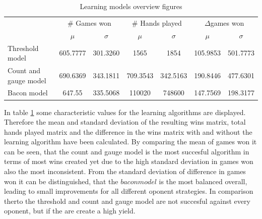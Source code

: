 \documentclass[11pt]{article}
\begin{document}
\begin{table}[]
\centering
\caption{Learning models overview figures}
\label{Learning models overview}
\begin{tabular}{lcccccc}
\cline{2-7}
                                           & \multicolumn{2}{c}{\# Games won}                      & \multicolumn{2}{c}{\# Hands played}                   & \multicolumn{2}{c}{$\Delta$games won} \\ \cline{2-7} 
\multicolumn{1}{c|}{}                       & \multicolumn{1}{c|}{$\mu$} & \multicolumn{1}{c|}{$\sigma$} & \multicolumn{1}{c|}{$\mu$} & \multicolumn{1}{c|}{$\sigma$} & \multicolumn{1}{c|}{$\mu$} & $\sigma$ \\ \hline
\multicolumn{1}{l|}{Threshold model}       & 605.7777                   & \multicolumn{1}{c|}{301.3260} & 1565                       & \multicolumn{1}{c|}{1854}     & 105.9853                   & 501.7773 \\ \hline
\multicolumn{1}{l|}{Count and gauge model} & 690.6369                   & \multicolumn{1}{c|}{343.1811} & 709.3543                   & \multicolumn{1}{c|}{342.5163} & 190.8446                   & 477.6301 \\ \hline
\multicolumn{1}{l|}{Bacon model}           & 647.55                     & \multicolumn{1}{c|}{335.5068}         & 110020                     & \multicolumn{1}{c|}{748600}   & 147.7569                            & 198.3177        \\ \hline

\end{tabular}
\end{table}


In table \ref{Learning models overview} some characteristic values for the learning algorithms are displayed. Therefore the mean and standard deviation of the resulting wins matrix, total hands played matrix and the difference in the wins matrix with and without the learning algorithm have been calculated. By comparing the mean of games won it can be seen, that the count and gauge model is the most succesful algorithm in terms of most wins created yet due to the high standard deviation in games won also the most inconsistent. From the standard deviation of difference in games won it can be distinguished, that the $bacon model$ is the most balanced overall, leading to small improvements for all different oponent strategies. In comparison therto the threshold and count and gauge model are not succesful against every oponent, but if the are create a high yield. \\
\end{document}
